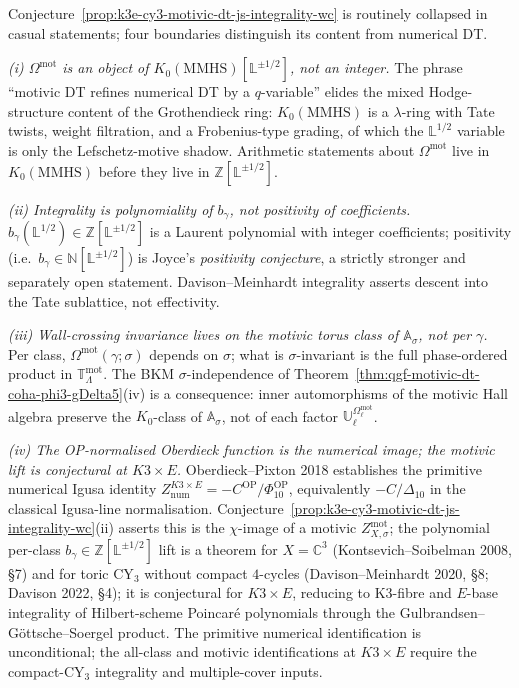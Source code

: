 \begin{remark}
\label{rem:k3e-cy3-motivic-boundaries}
Conjecture~\ref{prop:k3e-cy3-motivic-dt-js-integrality-wc} is routinely collapsed in casual statements; four boundaries distinguish its content from numerical DT.

\emph{(i) $\Omega^{\mathrm{mot}}$ is an object of $K_0(\mathrm{MMHS})[\mathbb L^{\pm 1/2}]$, not an integer.} The phrase ``motivic DT refines numerical DT by a $q$-variable'' elides the mixed Hodge-structure content of the Grothendieck ring: $K_0(\mathrm{MMHS})$ is a $\lambda$-ring with Tate twists, weight filtration, and a Frobenius-type grading, of which the $\mathbb L^{1/2}$ variable is only the Lefschetz-motive shadow. Arithmetic statements about $\Omega^{\mathrm{mot}}$ live in $K_0(\mathrm{MMHS})$ before they live in $\mathbb Z[\mathbb L^{\pm 1/2}]$.

\emph{(ii) Integrality is polynomiality of $b_\gamma$, not positivity of coefficients.} $b_\gamma(\mathbb L^{1/2}) \in \mathbb Z[\mathbb L^{\pm 1/2}]$ is a Laurent polynomial with integer coefficients; positivity (i.e.\ $b_\gamma \in \mathbb N[\mathbb L^{\pm 1/2}]$) is Joyce's \emph{positivity conjecture}, a strictly stronger and separately open statement. Davison--Meinhardt integrality asserts descent into the Tate sublattice, not effectivity.

\emph{(iii) Wall-crossing invariance lives on the motivic torus class of $\mathbb A_\sigma$, not per $\gamma$.} Per class, $\Omega^{\mathrm{mot}}(\gamma; \sigma)$ depends on $\sigma$; what is $\sigma$-invariant is the full phase-ordered product in $\mathbb T_\Lambda^{\mathrm{mot}}$. The BKM $\sigma$-independence of Theorem~\ref{thm:qgf-motivic-dt-coha-phi3-gDelta5}(iv) is a consequence: inner automorphisms of the motivic Hall algebra preserve the $K_0$-class of $\mathbb A_\sigma$, not of each factor $\mathbb U_\ell^{\Omega^{\mathrm{mot}}_\ell}$.

\emph{(iv) The OP-normalised Oberdieck function is the numerical image; the motivic lift is conjectural at $K3 \times E$.} Oberdieck--Pixton 2018 establishes the primitive numerical Igusa identity \(Z^{K3 \times E}_{\mathrm{num}}=-C^{\mathrm{OP}}/\Phi_{10}^{\mathrm{OP}}\), equivalently \(-C/\Delta_{10}\) in the classical Igusa-line normalisation. Conjecture~\ref{prop:k3e-cy3-motivic-dt-js-integrality-wc}(ii) asserts this is the $\chi$-image of a motivic $Z^{\mathrm{mot}}_{X, \sigma}$; the polynomial per-class $b_\gamma \in \mathbb Z[\mathbb L^{\pm 1/2}]$ lift is a theorem for $X = \mathbb C^3$ (Kontsevich--Soibelman 2008, \S 7) and for toric CY$_3$ without compact $4$-cycles (Davison--Meinhardt 2020, \S 8; Davison 2022, \S 4); it is conjectural for $K3 \times E$, reducing to K3-fibre and $E$-base integrality of Hilbert-scheme Poincar\'e polynomials through the Gulbrandsen--G\"ottsche--Soergel product. The primitive numerical identification is unconditional; the all-class and motivic identifications at $K3 \times E$ require the compact-CY$_3$ integrality and multiple-cover inputs.


\end{remark}
